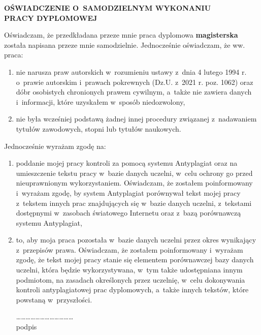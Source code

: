 
\begingroup
\begin{small}
     \begin{center}
          \large  \textbf{ OŚWIADCZENIE O~SAMODZIELNYM WYKONANIU \\ PRACY DYPLOMOWEJ}
     \end{center}

     Oświadczam, że przedkładana przeze mnie praca dyplomowa \textbf{magisterska} została napisana przeze mnie samodzielnie. Jednocześnie oświadczam, że ww. praca:
     \begin{enumerate}
          \item nie narusza praw autorskich w~rozumieniu ustawy z~dnia 4 lutego 1994 r. o~prawie autorskim i~prawach pokrewnych (Dz.U. z~2021 r. poz. 1062) oraz dóbr osobistych chronionych prawem cywilnym, a~także nie zawiera danych i~informacji, które uzyskałem w~sposób niedozwolony,
          \item nie była wcześniej podstawą żadnej innej procedury związanej z~nadawaniem tytułów zawodowych, stopni lub tytułów naukowych.

     \end{enumerate}

     Jednocześnie wyrażam zgodę na:

     \begin{enumerate}

          \item poddanie mojej pracy kontroli za pomocą systemu Antyplagiat oraz na umieszczenie tekstu pracy w~bazie danych uczelni, w~celu ochrony go przed nieuprawnionym wykorzystaniem. Oświadczam, że zostałem poinformowany i~wyrażam zgodę, by system Antyplagiat porównywał tekst mojej pracy z~tekstem innych prac znajdujących się w~bazie danych uczelni, z~tekstami dostępnymi w~zasobach światowego Internetu oraz z~bazą porównawczą systemu Antyplagiat,
          \item to, aby moja praca pozostała w~bazie danych uczelni przez okres wynikający z~przepisów prawa. Oświadczam, że zostałem poinformowany i~wyrażam zgodę, że tekst mojej pracy stanie się elementem porównawczej bazy danych uczelni, która będzie wykorzystywana, w~tym także udostępniana innym podmiotom, na zasadach określonych przez uczelnię, w~celu dokonywania kontroli antyplagiatowej prac dyplomowych, a~także innych tekstów, które powstaną w~przyszłości.

                \begin{flushright}
                    \vspace{2\baselineskip}
                     ……………………………… \\
                     podpis
                \end{flushright}


\end{enumerate}
\end{small}
